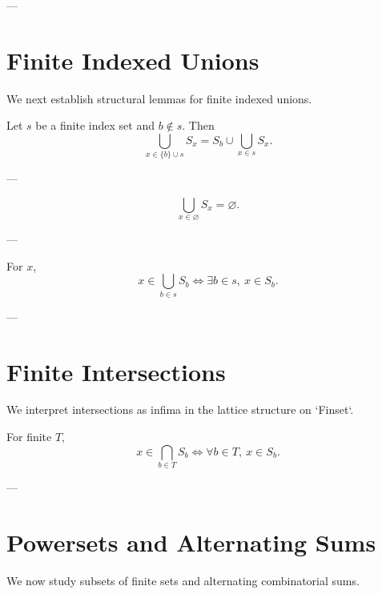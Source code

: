 
---

\section{Finite Indexed Unions}

We next establish structural lemmas for finite indexed unions.

\begin{lemma}\label{biUnion_insert}
Let \(s\) be a finite index set and \(b \notin s\). Then
\[
\bigcup_{x \in \{b\} \cup s} S_x
=
S_b \cup \bigcup_{x \in s} S_x.
\]
\end{lemma}


---

\begin{lemma}\label{biUnion_empty}
\[
\bigcup_{x \in \varnothing} S_x = \varnothing.
\]
\end{lemma}


---

\begin{lemma}\label{mem_biUnion}
For \(x\),
\[
x \in \bigcup_{b \in s} S_b
\iff
\exists b \in s,\ x \in S_b.
\]
\end{lemma}


---

\section{Finite Intersections}

We interpret intersections as infima in the lattice structure on `Finset`.

\begin{lemma}\label{mem_inf}
For finite \(T\),
\[
x \in \bigcap_{b \in T} S_b
\iff
\forall b \in T,\ x \in S_b.
\]
\end{lemma}


---

\section{Powersets and Alternating Sums}

We now study subsets of finite sets and alternating combinatorial sums.

